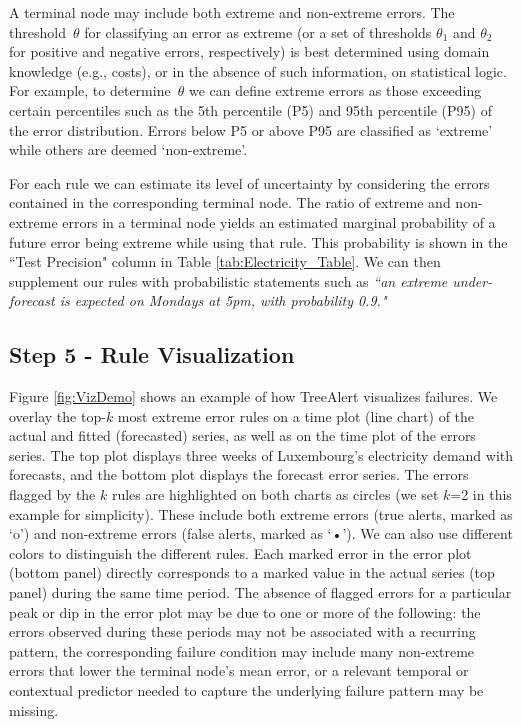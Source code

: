 \documentclass[ijds,sglanonrev]{informs4}
\begin{document}
A terminal node may include both extreme and non-extreme errors. The threshold~$\theta$ for classifying an error as extreme (or a set of thresholds $\theta_1$ and $\theta_2$ for positive and negative errors, respectively) is best determined using domain knowledge (e.g., costs), or in the absence of such information, on statistical logic. For example, to determine~$\theta$ we can define extreme errors as those exceeding certain percentiles such as the 5th percentile (P5) and 95th percentile (P95) of the error distribution. Errors below P5 or above P95 are classified as `extreme’ while others are deemed `non-extreme’. 

For each rule we can estimate its level of uncertainty by considering the errors contained in the corresponding terminal node. The ratio of extreme and non-extreme errors in a terminal node yields an estimated marginal probability of a future error being extreme while using that rule. This probability is shown in the ``Test Precision" column in Table \ref{tab:Electricity_Table}. We can then supplement our rules with probabilistic statements such as \textit{``an extreme under-forecast is expected on Mondays at 5pm, with probability 0.9."}

\subsection{Step 5 - Rule Visualization}

Figure \ref{fig:VizDemo} shows an example of how TreeAlert visualizes failures. We overlay the top-$k$ most extreme error rules on a time plot (line chart) of the actual and fitted (forecasted) series, as well as on the time plot of the errors series. The top plot displays three weeks of Luxembourg’s electricity demand with forecasts, and the bottom plot displays the forecast error series. The errors flagged by the $k$ rules are highlighted on both charts as circles (we set $k$=2 in this example for simplicity). These include both extreme errors (true alerts, marked as ‘o’) and non-extreme errors (false alerts, marked as ‘•’). We can also use different colors to distinguish the different rules. Each marked error in the error plot (bottom panel) directly corresponds to a marked value in the actual series (top panel) during the same time period. The absence of flagged errors for a particular peak or dip in the error plot may be due to one or more of the following: the errors observed during these periods may not be associated with a recurring pattern, the corresponding failure condition may include many non-extreme errors that lower the terminal node’s mean error, or a relevant temporal or contextual predictor needed to capture the underlying failure pattern may be missing.
\end{document}
